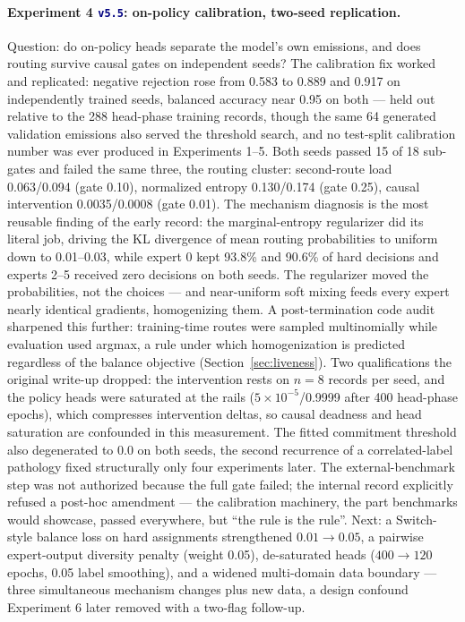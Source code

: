 \documentclass[10pt,a4paper]{article}
\newcommand{\studytag}[1]{\colorbox{navy!10}{\textcolor{navy}{\footnotesize\texttt{#1}}}}
\begin{document}
\paragraph{Experiment 4 \studytag{v5.5}: on-policy calibration, two-seed replication.}
Question: do on-policy heads separate the model's own emissions, and does routing survive causal gates on independent seeds? The calibration fix worked and replicated: negative rejection rose from 0.583 to 0.889 and 0.917 on independently trained seeds, balanced accuracy near 0.95 on both --- held out relative to the 288 head-phase training records, though the same 64 generated validation emissions also served the threshold search, and no test-split calibration number was ever produced in Experiments 1--5. Both seeds passed 15 of 18 sub-gates and failed the same three, the routing cluster: second-route load 0.063/0.094 (gate 0.10), normalized entropy 0.130/0.174 (gate 0.25), causal intervention 0.0035/0.0008 (gate 0.01). The mechanism diagnosis is the most reusable finding of the early record: the marginal-entropy regularizer did its literal job, driving the KL divergence of mean routing probabilities to uniform down to 0.01--0.03, while expert 0 kept 93.8\% and 90.6\% of hard decisions and experts 2--5 received zero decisions on both seeds. The regularizer moved the probabilities, not the choices --- and near-uniform soft mixing feeds every expert nearly identical gradients, homogenizing them. A post-termination code audit sharpened this further: training-time routes were sampled multinomially while evaluation used argmax, a rule under which homogenization is predicted regardless of the balance objective (Section~\ref{sec:liveness}). Two qualifications the original write-up dropped: the intervention rests on $n=8$ records per seed, and the policy heads were saturated at the rails ($5\times10^{-5}$/0.9999 after 400 head-phase epochs), which compresses intervention deltas, so causal deadness and head saturation are confounded in this measurement. The fitted commitment threshold also degenerated to 0.0 on both seeds, the second recurrence of a correlated-label pathology fixed structurally only four experiments later. The external-benchmark step was not authorized because the full gate failed; the internal record explicitly refused a post-hoc amendment --- the calibration machinery, the part benchmarks would showcase, passed everywhere, but ``the rule is the rule''. Next: a Switch-style balance loss on hard assignments \cite{fedus2022,shazeer2017} strengthened $0.01 \rightarrow 0.05$, a pairwise expert-output diversity penalty (weight 0.05), de-saturated heads ($400 \rightarrow 120$ epochs, 0.05 label smoothing), and a widened multi-domain data boundary --- three simultaneous mechanism changes plus new data, a design confound Experiment 6 later removed with a two-flag follow-up.
\end{document}
